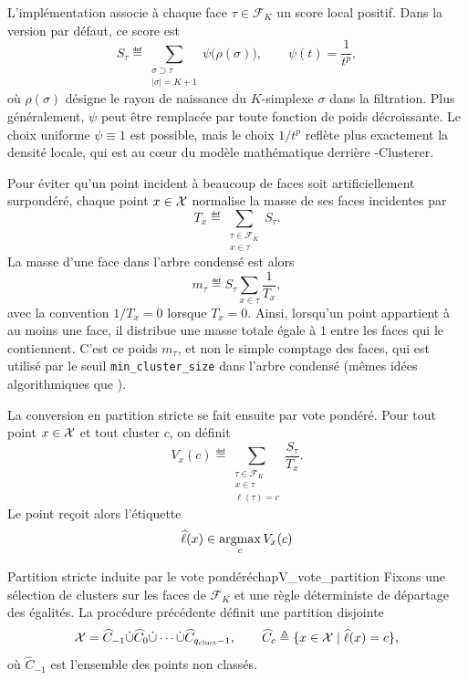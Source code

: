 L'implémentation associe à chaque face $\tau\in\mathcal F_K$ un score local positif. Dans la version par défaut, ce score est
\[
    S_\tau
    \eqdef
    \sum_{\substack{\sigma\supset\tau\\ |\sigma|=K+1}}
        \psi\bigl(\rho(\sigma)\bigr),
    \qquad
    \psi(t)=\frac{1}{t^p},
\]
où $\rho(\sigma)$ désigne le rayon de naissance du $K$-simplexe $\sigma$ dans la filtration. Plus généralement, $\psi$ peut être remplacée par toute fonction de poids décroissante. Le choix uniforme $\psi\equiv1$ est possible, mais le choix $1/t^p$ reflète plus exactement la densité locale, qui est au cœur du modèle mathématique derrière \HGP-Clusterer.

Pour éviter qu'un point incident à beaucoup de faces soit artificiellement surpondéré, chaque point $x\in\mathcal{X}$ normalise la masse de ses faces incidentes par
\[
    T_x
    \eqdef
    \sum_{\substack{\tau\in\mathcal F_K\\ x\in\tau}} S_\tau.
\]
La masse d'une face dans l'arbre condensé est alors
\[
    m_\tau
    \eqdef
    S_\tau
    \sum_{x\in\tau}\frac1{T_x},
\]
avec la convention $1/T_x=0$ lorsque $T_x=0$. Ainsi, lorsqu'un point appartient à au moins une face, il distribue une masse totale égale à $1$ entre les faces qui le contiennent. C'est ce poids $m_\tau$, et non le simple comptage des faces, qui est utilisé par le seuil \texttt{min\_cluster\_size} dans l'arbre condensé (mêmes idées algorithmiques que \HDBSCAN).

La conversion en partition stricte se fait ensuite par vote pondéré. Pour tout point $x\in\mathcal{X}$ et tout cluster $c$, on définit
\[
    V_x(c)
    \eqdef
    \sum_{\substack{\tau\in\mathcal F_K\\ x\in\tau\\ \ell(\tau)=c}}
        \frac{S_\tau}{T_x}.
\]
Le point reçoit alors l'étiquette
\[
    \widehat\ell(x)
    \in
    \mathop{\mathrm{argmax }}_c V_x(c)
\]

\begin{Fait}{Partition stricte induite par le vote pondéré}{chapV_vote_partition}
Fixons une sélection de clusters sur les faces de $\mathcal F_K$ et une règle déterministe de départage des égalités. La procédure précédente définit une partition disjointe
\[
    \mathcal{X}
    =
    \widehat C_{-1} \dot \cup \widehat C_0 \dot \cup  \cdots \dot \cup  \widehat C_{q_\mathrm{clust}-1},
    \qquad
    \widehat C_c\triangleq\{x\in\mathcal{X}\mid \widehat\ell(x)=c\},
\]
où $\widehat C_{-1}$ est l'ensemble des points non classés. %
\end{Fait}

